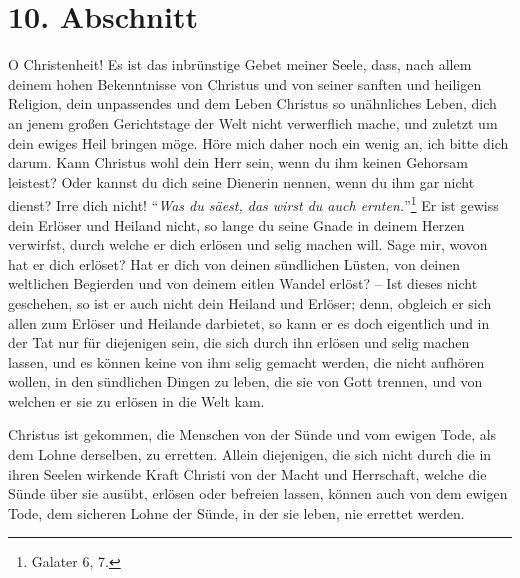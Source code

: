 \section{10. Abschnitt} \label{kap1_ab10}

O Christenheit!
Es ist das inbrünstige Gebet meiner Seele, dass, nach allem deinem hohen
Bekenntnisse von Christus und von seiner sanften und heiligen Religion, dein
unpassendes und dem Leben Christus so unähnliches Leben, dich an jenem großen
Gerichtstage der Welt nicht verwerflich mache, und zuletzt um dein ewiges Heil
bringen möge.
Höre mich daher noch ein wenig an,
ich bitte dich darum.
Kann Christus wohl dein Herr sein, wenn du ihm keinen Gehorsam leistest?
Oder kannst du dich seine Dienerin nennen, wenn du ihm gar nicht dienst? Irre
dich nicht!
"`\textit{Was du säest, das wirst du auch ernten.}"'\footnote{Galater 6, 7.}
Er ist gewiss dein Erlöser und Heiland nicht, so lange du seine Gnade in deinem
Herzen verwirfst, durch welche er dich erlösen und selig machen will.
Sage mir, wovon hat er dich erlöset? 
Hat er dich von deinen sündlichen Lüsten, von deinen weltlichen Begierden und
von deinem eitlen Wandel erlöst?
-- Ist dieses nicht geschehen, so ist er auch nicht dein Heiland und Erlöser;
denn, obgleich er sich allen zum Erlöser und Heilande darbietet, so kann er es
doch eigentlich und in der Tat nur für diejenigen sein, die sich durch ihn
erlösen und selig machen lassen,
und es können keine von ihm selig gemacht werden, die nicht aufhören wollen, in
den sündlichen Dingen zu leben, die sie von Gott trennen, und von welchen er sie
zu erlösen in die Welt kam.

\medskip

Christus ist gekommen, die Menschen von der Sünde und vom ewigen Tode, als dem
Lohne derselben, zu erretten.
Allein diejenigen, die sich nicht durch die in ihren Seelen wirkende Kraft
Christi von der Macht und Herrschaft, welche die Sünde über sie ausübt, erlösen
oder befreien lassen, können auch von dem ewigen Tode, dem sicheren Lohne der
Sünde, in der sie leben, nie errettet werden.

\medskip

